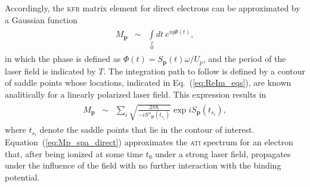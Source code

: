 Accordingly, the \textsc{kfr} matrix element for direct electrons can
be approximated by a Gaussian function~\cite{phd_Kopold}
%
\begin{eqnarray}
  \label{eq:KFR_Mp}
  \begin{split}
    M_{\mathbf{p}} & \sim & \int\limits_{0}\limits^{T} dt\ e^{i \eta \Phi(t)},
  \end{split}
\end{eqnarray}
%
in which the phase is defined as $\Phi(t) = S_{\mathbf{p}}(t)\omega /
U_{p}$, and the period of the laser field is indicated by $T$. The
integration path to follow is defined by a contour of saddle points
whose locations, indicated in Eq.~(\ref{eq:ReIm_eqs}), are known
analitically for a linearly polarized laser field. This expression
results in~\cite{phd_Kopold}
%
\begin{eqnarray}
  \label{eq:Mp_spa_direct}
  \begin{split}
    M_{\mathbf{p}} & \sim & \sum\limits_{i}
    \sqrt{\frac{2\pi\hbar}{-i S''_{\mathbf{p}}(t_{s_{i}})}}
    \exp iS_{\mathbf{p}}(t_{s_{i}}),
  \end{split}
\end{eqnarray}
%
where $t_{s_{i}}$ denote the saddle points that lie in the contour of
interest. Equation~(\ref{eq:Mp_spa_direct}) approximates the
\textsc{ati} spectrum for an electron that, after being ionized at
some time $t_{0}$ under a strong laser field, propagates under the
influence of the field with no further interaction with the binding
potential.


